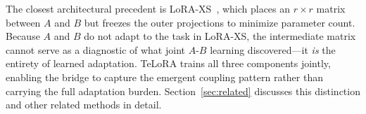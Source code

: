 The closest architectural precedent is LoRA-XS~\cite{banaei2024loraxs},
which places an $r \times r$ matrix between $A$ and $B$ but freezes
the outer projections to minimize parameter count.
Because $A$ and $B$ do not adapt to the task in LoRA-XS, the
intermediate matrix cannot serve as a diagnostic of what joint
$A$-$B$ learning discovered---it \emph{is} the entirety of learned
adaptation.
TeLoRA trains all three components jointly, enabling the bridge
to capture the emergent coupling pattern rather than carrying the full
adaptation burden.
Section~\ref{sec:related} discusses this distinction and other related
methods in detail.
